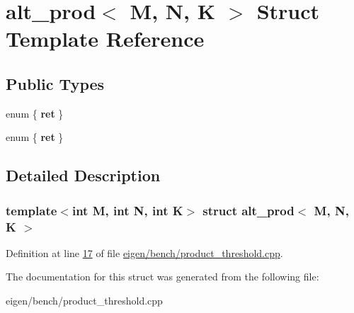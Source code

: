 \hypertarget{structalt__prod}{}\section{alt\+\_\+prod$<$ M, N, K $>$ Struct Template Reference}
\label{structalt__prod}
\subsection*{Public Types}
\begin{DoxyCompactItemize}
\item 
\mbox{\label{structalt__prod_a7f6d659326dd60c9d6fae7fab2a95439}} 
enum \{ {\bfseries ret}
 \}
\item 
\mbox{\label{structalt__prod_a2d7fd843709f68e28c1bf48539f580e3}} 
enum \{ {\bfseries ret}
 \}
\end{DoxyCompactItemize}


\subsection{Detailed Description}
\subsubsection*{template$<$int M, int N, int K$>$\newline
struct alt\+\_\+prod$<$ M, N, K $>$}



Definition at line \hyperlink{eigen_2bench_2product__threshold_8cpp_source_l00017}{17} of file \hyperlink{eigen_2bench_2product__threshold_8cpp_source}{eigen/bench/product\+\_\+threshold.\+cpp}.



The documentation for this struct was generated from the following file\+:\begin{DoxyCompactItemize}
\item 
eigen/bench/product\+\_\+threshold.\+cpp\end{DoxyCompactItemize}
